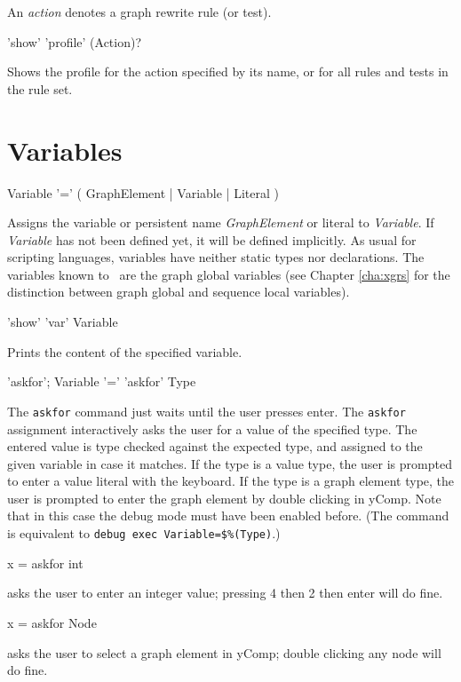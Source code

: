 An \emph{action} denotes a graph rewrite rule (or test).

\begin{rail}
  'show' 'profile' (Action)?
\end{rail}
Shows the profile for the action specified by its name, or for all rules and tests in the rule set.


\section{Variables}

\begin{rail}
  Variable '=' ( GraphElement | Variable | Literal )
\end{rail}
Assigns the variable or persistent name \emph{GraphElement} or literal to \emph{Variable}.
If \emph{Variable} has not been defined yet, it will be defined implicitly.
As usual for scripting languages, variables have neither static types nor declarations.
The variables known to \GrShell\ are the graph global variables (see Chapter \ref{cha:xgrs} for the distinction between graph global and sequence local variables).

\begin{rail}
'show' 'var' Variable
\end{rail}
Prints the content of the specified variable.

\begin{rail}
  'askfor';
  Variable '=' 'askfor' Type
\end{rail}
The \texttt{askfor} command just waits until the user presses enter.
The \texttt{askfor} assignment interactively asks the user for a value of the specified type.
The entered value is type checked against the expected type, and assigned to the given variable in case it matches.
If the type is a value type, the user is prompted to enter a value literal with the keyboard.
If the type is a graph element type, the user is prompted to enter the graph element by double clicking in yComp.
Note that in this case the debug mode must have been enabled before.
(The command is equivalent to \verb#debug exec Variable=$%(Type)#.)

\begin{example}
\begin{grshelllet}
x = askfor int
\end{grshelllet}
asks the user to enter an integer value; pressing 4 then 2 then enter will do fine.
\begin{grshelllet}
x = askfor Node
\end{grshelllet}
asks the user to select a graph element in yComp; double clicking any node will do fine.
\end{example}


